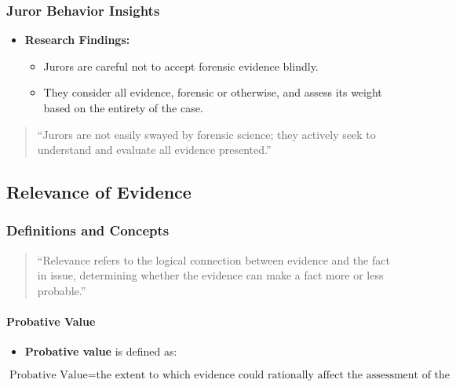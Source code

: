 \subsubsection{Juror Behavior Insights}\label{juror-behavior-insights}

\begin{itemize}
\tightlist
\item
  \textbf{Research Findings:}

  \begin{itemize}
  \tightlist
  \item
    Jurors are careful not to accept forensic evidence blindly.
  \item
    They consider all evidence, forensic or otherwise, and assess its
    weight based on the entirety of the case.
  \end{itemize}
\end{itemize}

\begin{quote}
``Jurors are not easily swayed by forensic science; they actively seek
to understand and evaluate all evidence presented.''
\end{quote}

\subsection{ Relevance of Evidence}\label{relevance-of-evidence}

\subsubsection{Definitions and Concepts}\label{definitions-and-concepts}

\begin{quote}
``Relevance refers to the logical connection between evidence and the
fact in issue, determining whether the evidence can make a fact more or
less probable.''
\end{quote}

\paragraph{Probative Value}\label{probative-value}

\begin{itemize}
\tightlist
\item
  \textbf{Probative value} is defined as:
\end{itemize}

\[\text{Probative Value} = \text{the extent to which evidence could rationally affect the assessment of the probability of the existence of a fact in issue}\]

